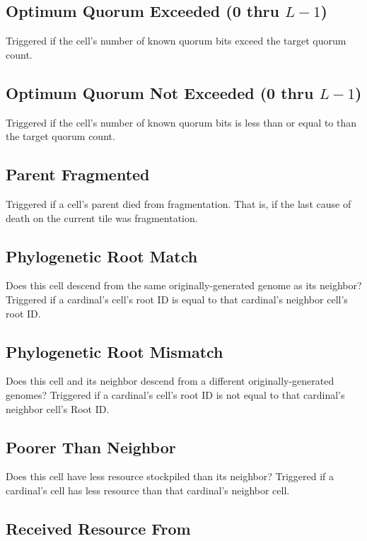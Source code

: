 \subsection{Optimum Quorum Exceeded (0 thru $L-1$)}

Triggered if the cell's number of known quorum bits exceed the target quorum count.

\subsection{Optimum Quorum Not Exceeded (0 thru $L-1$)}

Triggered if the cell's number of known quorum bits is less than or equal to than the target quorum count.

\subsection{Parent Fragmented}

Triggered if a cell's parent died from fragmentation.
That is, if the last cause of death on the current tile was fragmentation.

\subsection{Phylogenetic Root Match}

Does this cell descend from the same originally-generated genome as its neighbor?
Triggered if a cardinal's cell's root ID is equal to that cardinal's neighbor cell's root ID. 

\subsection{Phylogenetic Root Mismatch}

Does this cell and its neighbor descend from a different originally-generated genomes?
Triggered if a cardinal's cell's root ID is not equal to that cardinal's neighbor cell's Root ID.

\subsection{Poorer Than Neighbor}

Does this cell have less resource stockpiled than its neighbor?
Triggered if a cardinal's cell has less resource than that cardinal's neighbor cell.

\subsection{Received Resource From}

